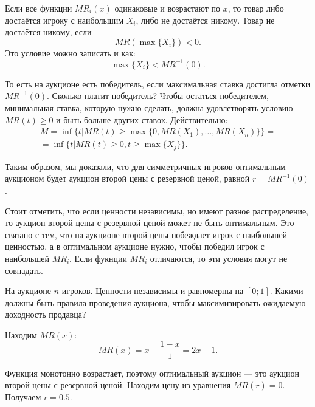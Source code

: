 \begin{myex} Если все функции $ MR_{i}(x) $ одинаковые и возрастают по $ x $, то товар либо достаётся игроку с наибольшим $ X_{i} $, либо не достаётся никому. Товар не достаётся никому, если
\begin{equation}
MR(\max\{X_{i}\})<0.
\end{equation}
Это условие можно записать и как:
\begin{equation}
\max\{X_{i}\}<MR^{-1}(0).
\end{equation}

То есть на аукционе есть победитель, если максимальная ставка достигла отметки $ MR^{-1}(0) $. Сколько платит победитель? Чтобы остаться победителем, минимальная ставка, которую нужно сделать, должна удовлетворять условию $ MR(t)\geq 0 $ и быть больше других ставок. Действительно:
\begin{multline}
M=\inf\{ t| MR(t)\geq \max\{0, MR(X_{1}), \ldots, MR(X_n) \}  \} =\\
= \inf\{ t| MR(t)\geq 0 , t\geq \max\{X_{j}\} \}.
\end{multline}

Таким образом, мы доказали, что для симметричных игроков оптимальным аукционом будет аукцион второй цены с резервной ценой, равной $ r=MR^{-1}(0) $.
\end{myex}


Стоит отметить, что если ценности независимы, но имеют разное распределение, то аукцион второй цены с резервной ценой может не быть оптимальным. Это связано с тем, что на аукционе второй цены побеждает игрок с наибольшей ценностью, а в оптимальном аукционе нужно, чтобы победил игрок с наибольшей $ MR_{i} $. Если фукнции $ MR_{i} $ отличаются, то эти условия могут не совпадать.

\begin{myex} На аукционе $ n $ игроков. Ценности независимы и равномерны на $ [0;1] $. Какими должны быть правила проведения аукциона, чтобы максимизировать ожидаемую доходность продавца?

Находим $ MR(x)$:
\begin{equation}
MR(x)=x-\frac{1-x}{1}=2x-1.
\end{equation}

Функция монотонно возрастает, поэтому оптимальный аукцион — это аукцион второй цены с резервной ценой. Находим цену из уравнения $ MR(r)=0 $. Получаем $ r=0.5 $.
\end{myex}




